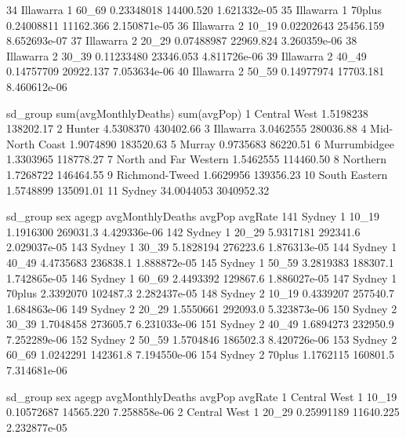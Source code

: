 \documentclass[a4paper]{article}                %
\begin{document}
\begin{Schunk}
\begin{Soutput}
34    Illawarra   1  60_69       0.23348018 14400.520 1.621332e-05
35    Illawarra   1 70plus       0.24008811 11162.366 2.150871e-05
36    Illawarra   2  10_19       0.02202643 25456.159 8.652693e-07
37    Illawarra   2  20_29       0.07488987 22969.824 3.260359e-06
38    Illawarra   2  30_39       0.11233480 23346.053 4.811726e-06
39    Illawarra   2  40_49       0.14757709 20922.137 7.053634e-06
40    Illawarra   2  50_59       0.14977974 17703.181 8.460612e-06
\end{Soutput}
\begin{Soutput}
                sd_group sum(avgMonthlyDeaths) sum(avgPop)
1           Central West             1.5198238   138202.17
2                 Hunter             4.5308370   430402.66
3              Illawarra             3.0462555   280036.88
4        Mid-North Coast             1.9074890   183520.63
5                 Murray             0.9735683    86220.51
6           Murrumbidgee             1.3303965   118778.27
7  North and Far Western             1.5462555   114460.50
8               Northern             1.7268722   146464.55
9         Richmond-Tweed             1.6629956   139356.23
10         South Eastern             1.5748899   135091.01
11                Sydney            34.0044053  3040952.32
\end{Soutput}
\begin{Soutput}
    sd_group sex  agegp avgMonthlyDeaths   avgPop      avgRate
141   Sydney   1  10_19        1.1916300 269031.3 4.429336e-06
142   Sydney   1  20_29        5.9317181 292341.6 2.029037e-05
143   Sydney   1  30_39        5.1828194 276223.6 1.876313e-05
144   Sydney   1  40_49        4.4735683 236838.1 1.888872e-05
145   Sydney   1  50_59        3.2819383 188307.1 1.742865e-05
146   Sydney   1  60_69        2.4493392 129867.6 1.886027e-05
147   Sydney   1 70plus        2.3392070 102487.3 2.282437e-05
148   Sydney   2  10_19        0.4339207 257540.7 1.684863e-06
149   Sydney   2  20_29        1.5550661 292093.0 5.323873e-06
150   Sydney   2  30_39        1.7048458 273605.7 6.231033e-06
151   Sydney   2  40_49        1.6894273 232950.9 7.252289e-06
152   Sydney   2  50_59        1.5704846 186502.3 8.420726e-06
153   Sydney   2  60_69        1.0242291 142361.8 7.194550e-06
154   Sydney   2 70plus        1.1762115 160801.5 7.314681e-06
\end{Soutput}
\begin{Soutput}
       sd_group sex  agegp avgMonthlyDeaths    avgPop      avgRate
1  Central West   1  10_19       0.10572687 14565.220 7.258858e-06
2  Central West   1  20_29       0.25991189 11640.225 2.232877e-05

\end{Soutput}
\end{Schunk}
\end{document}
